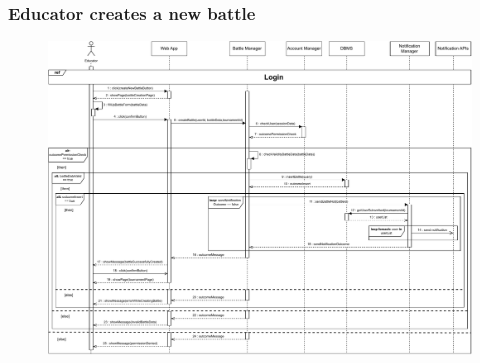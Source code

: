 \documentclass{article}
\begin{document}
{    \subsubsection{Educator creates a new battle}
        \begin{figure}[H]
            \centering
            \hspace*{-3.1cm}\includegraphics[scale=0.6]{Sequence/Sequence6DD.pdf}
            \caption{}
            \label{fig:Sequence6DD}
        \end{figure}

}
\end{document}
